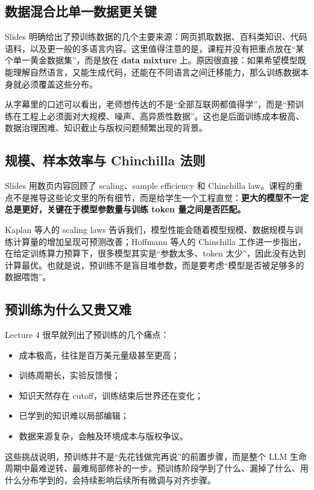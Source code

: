 \documentclass[a4paper]{article}
\begin{document}
\subsection{数据混合比单一数据更关键}
Slides 明确给出了预训练数据的几个主要来源：网页抓取数据、百科类知识、代码语料，以及更一般的多语言内容。这里值得注意的是，课程并没有把重点放在“某个单一黄金数据集”，而是放在 \textbf{data mixture} 上。原因很直接：如果希望模型既能理解自然语言，又能生成代码，还能在不同语言之间迁移能力，那么训练数据本身就必须覆盖这些分布。

从字幕里的口述可以看出，老师想传达的不是“全部互联网都值得学”，而是“预训练在工程上必须面对大规模、噪声、高异质性数据”。这也是后面训练成本极高、数据治理困难、知识截止与版权问题频繁出现的背景。

\subsection{规模、样本效率与 Chinchilla 法则}
Slides 用数页内容回顾了 scaling、sample efficiency 和 Chinchilla law。课程的重点不是推导这些论文里的所有细节，而是给学生一个工程直觉：\textbf{更大的模型不一定总是更好，关键在于模型参数量与训练 token 量之间是否匹配。}

Kaplan 等人的 scaling laws 告诉我们，模型性能会随着模型规模、数据规模与训练计算量的增加呈现可预测改善；Hoffmann 等人的 Chinchilla 工作进一步指出，在给定训练算力预算下，很多模型其实是“参数太多、token 太少”，因此没有达到计算最优。也就是说，预训练不是盲目堆参数，而是要考虑“模型是否被足够多的数据喂饱”。

\subsection{预训练为什么又贵又难}
Lecture 4 很早就列出了预训练的几个痛点：
\begin{itemize}
\item 成本极高，往往是百万美元量级甚至更高；
\item 训练周期长，实验反馈慢；
\item 知识天然存在 cutoff，训练结束后世界还在变化；
\item 已学到的知识难以局部编辑；
\item 数据来源复杂，会触及环境成本与版权争议。
\end{itemize}

这些挑战说明，预训练并不是“先花钱做完再说”的前置步骤，而是整个 LLM 生命周期中最难逆转、最难局部修补的一步。预训练阶段学到了什么、漏掉了什么、用什么分布学到的，会持续影响后续所有微调与对齐步骤。
\end{document}
